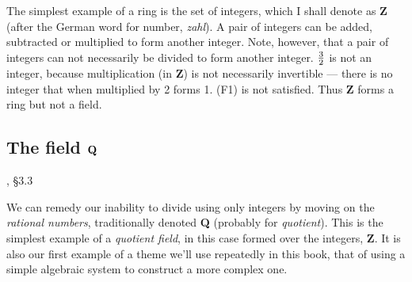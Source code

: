 \begin{comment}

\theorem (The Zero Theorem)

Given a ring ${\cal R}$, $\forall x\in{\cal R}, 0x=0$

\proof

From the equation $0x=0x+0x+(-0x)=(0+0)x+(-0x)=0x+(-0x)=0$.

\begin{tabular}{r c l l @{\vbox to20pt{}}}

$0x+(-0x)$ &=& $0$ & R6 applied to $0x$ \cr
$0+0x$ &=& $0x$ & R5 applied to $0x$ \cr
$0+0x + (-0x)$ &=& $0$ & principle of equality \cr

   & & &\cr

$(0+0x)+(-0x)$ &=& $0$ & principle of equality\cr
$(0\cdot 1+0x)+(-0x)$ &=& $0$ & RwU1\cr
$0(\cdot 1+x)+(-0x)$ &=& $0$ & R4\cr

\end{tabular}

$=(0+0)x+(-0x)=0x+(-0x)=0$.

applied
into , obtained from R5 applied to $0x$, then used R5 to
factor out $(0+0)$ and R6 to replace this with $0$, then R6 again to
conclude that $0x+(-0x)=0$.

Thus, multiplication by zero is a property of all rings.

\endtheorem

\end{comment}

The simplest example of a ring is the set of integers, which I shall
denote as {\bf Z} (after the German word for number, {\it zahl}).  A pair
of integers can be added, subtracted or multiplied to form another
integer.  Note, however, that a pair of integers can not necessarily
be divided to form another integer.  $3 \over 2$ is not an integer,
because multiplication (in {\bf Z}) is not necessarily invertible ---
there is no integer that when multiplied by 2 forms 1.
(F1) is not satisfied.
Thus {\bf Z} forms a ring but not a field.

\subsection*{\qquad The field ${\bf Q}$}
, \S3.3

We can remedy our inability to divide using only integers
by moving on the {\it rational numbers},
traditionally denoted {\bf Q} (probably for {\it quotient}).  This is the
simplest example of a {\it quotient field}, in this case formed over
the integers, {\bf Z}.  It is also our first example of a theme
we'll use repeatedly in this book, that of using a simple
algebraic system to construct a more complex one.

